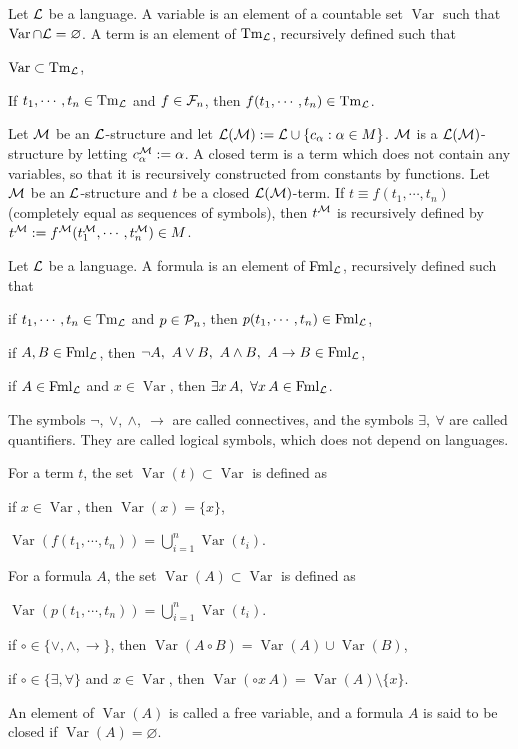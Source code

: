 \documentclass{../../small}
\DeclareMathOperator{\Var}{Var}
\DeclareMathOperator{\Tm}{Tm}
\DeclareMathOperator{\Fml}{Fml}
\begin{document}
\begin{defn}[Term]
Let $\mathcal{L}$ be a language.
A variable is an element of a countable set $\Var$ such that $\Var\cap\cL=\varnothing$.
A term is an element of $\Tm_\cL$, recursively defined such that
\begin{parts}
\item $\Var\subset\Tm_\cL$,
\item If $t_1,\cdots,t_n\in\Tm_\cL$ and $f\in\mathcal{F}_n$, then $f(t_1,\cdots,t_n)\in\Tm_\cL$.
\end{parts}
\end{defn}


Let $\mathcal{M}$ be an $\mathcal{L}$-structure and let $\mathcal{L}(\mathcal{M}):=\mathcal{L}\cup\{c_\alpha:\alpha\in M\}$.
$\mathcal{M}$ is a $\mathcal{L}(\mathcal{M})$-structure by letting $c_\alpha^{\mathcal{M}}:=\alpha$.
A closed term is a term which does not contain any variables, so that it is recursively constructed from constants by functions.
Let $\mathcal{M}$ be an $\mathcal{L}$-structure and $t$ be a closed $\mathcal{L}(\mathcal{M})$-term.
If $t\equiv f(t_1,\cdots,t_n)$ (completely equal as sequences of symbols), then $t^{\mathcal{M}}$ is recursively defined by $t^{\mathcal{M}}:=f^{\mathcal{M}}(t_1^{\mathcal{M}},\cdots,t_n^{\mathcal{M}})\in M$.


\begin{defn}[Formula]
Let $\mathcal{L}$ be a language.
A formula is an element of $\Fml_\cL$, recursively defined such that
\begin{parts}
\item if $t_1,\cdots,t_n\in\Tm_\cL$ and $p\in\mathcal{P}_n$, then $p(t_1,\cdots,t_n)\in\Fml_\cL$,
\item if $A,B\in\Fml_\cL$, then $\neg A,\ A\vee B,\ A\wedge B,\ A\to B\in\Fml_\cL$,
\item if $A\in\Fml_\cL$ and $x\in\Var$, then $\exists x\,A,\ \forall x\,A\in\Fml_\cL$.
\end{parts}
The symbols $\neg,\ \vee,\ \wedge,\ \to$ are called connectives, and the symbols $\exists,\ \forall$ are called quantifiers.
They are called logical symbols, which does not depend on languages. 
\end{defn}

\begin{defn}
For a term $t$, the set $\Var(t)\subset\Var$ is defined as
\begin{parts}
\item if $x\in\Var$, then $\Var(x)=\{x\}$,
\item $\Var(f(t_1,\cdots,t_n))=\bigcup_{i=1}^n\Var(t_i)$.
\end{parts}
For a formula $A$, the set $\Var(A)\subset\Var$ is defined as
\begin{parts}
\item $\Var(p(t_1,\cdots,t_n))=\bigcup_{i=1}^n\Var(t_i)$.
\item if $\circ\in\{\vee,\wedge,\to\}$, then $\Var(A\circ B)=\Var(A)\cup\Var(B)$,
\item if $\circ\in\{\exists,\forall\}$ and $x\in\Var$, then $\Var(\circ x\,A)=\Var(A)\setminus\{x\}$.
\end{parts}
An element of $\Var(A)$ is called a free variable, and a formula $A$ is said to be closed if $\Var(A)=\varnothing$.
\end{defn}
\end{document}
